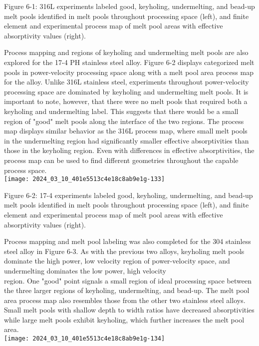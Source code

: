 \documentclass[10pt]{article}
\begin{document}
Figure 6-1: 316L experiments labeled good, keyholing, undermelting, and bead-up melt pools identified in melt pools throughout processing space (left), and finite element and experimental process map of melt pool areas with effective absorptivity values (right).

Process mapping and regions of keyholing and undermelting melt pools are also explored for the 17-4 PH stainless steel alloy. Figure 6-2 displays categorized melt pools in power-velocity processing space along with a melt pool area process map for the alloy. Unlike 316L stainless steel, experiments throughout power-velocity processing space are dominated by keyholing and undermelting melt pools. It is important to note, however, that there were no melt pools that required both a keyholing and undermelting label. This suggests that there would be a small region of "good" melt pools along the interface of the two regions. The process map displays similar behavior as the 316L process map, where small melt pools in the undermelting region had significantly smaller effective absorptivities than those in the keyholing region. Even with differences in effective absorptivities, the process map can be used to find different geometries throughout the capable process space.\\
\texttt{[image: 2024\_03\_10\_401e5513c4e18c8ab9e1g-133]}

Figure 6-2: 17-4 experiments labeled good, keyholing, undermelting, and bead-up melt pools identified in melt pools throughout processing space (left), and finite element and experimental process map of melt pool areas with effective absorptivity values (right).

Process mapping and melt pool labeling was also completed for the 304 stainless steel alloy in Figure 6-3. As with the previous two alloys, keyholing melt pools dominate the high power, low velocity region of power-velocity space, and undermelting dominates the low power, high velocity\\
region. One "good" point signals a small region of ideal processing space between the three larger regions of keyholing, undermelting, and bead-up. The melt pool area process map also resembles those from the other two stainless steel alloys. Small melt pools with shallow depth to width ratios have decreased absorptivities while large melt pools exhibit keyholing, which further increases the melt pool area.\\
\texttt{[image: 2024\_03\_10\_401e5513c4e18c8ab9e1g-134]}
\end{document}
